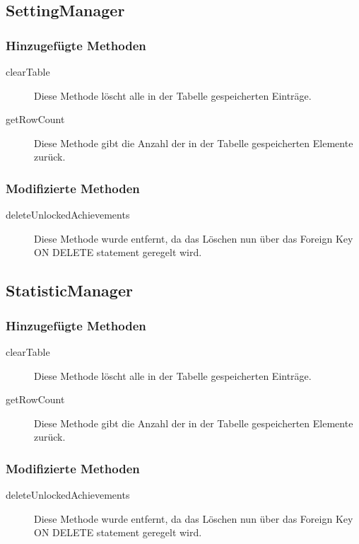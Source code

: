 \subsection{SettingManager}

\subsubsection{Hinzugefügte Methoden}
\begin{description}
\item[clearTable]
Diese Methode löscht alle in der Tabelle gespeicherten Einträge.
\item[getRowCount]
Diese Methode gibt die Anzahl der in der Tabelle gespeicherten Elemente zurück.
\end{description}

\subsubsection{Modifizierte Methoden}
\begin{description}
\item[deleteUnlockedAchievements]
Diese Methode wurde entfernt, da das Löschen nun über das Foreign Key ON DELETE statement geregelt wird.
\end{description}


\subsection{StatisticManager}

\subsubsection{Hinzugefügte Methoden}
\begin{description}
\item[clearTable]
Diese Methode löscht alle in der Tabelle gespeicherten Einträge.
\item[getRowCount]
Diese Methode gibt die Anzahl der in der Tabelle gespeicherten Elemente zurück.
\end{description}

\subsubsection{Modifizierte Methoden}
\begin{description}
\item[deleteUnlockedAchievements]
Diese Methode wurde entfernt, da das Löschen nun über das Foreign Key ON DELETE statement geregelt wird.
\end{description}


